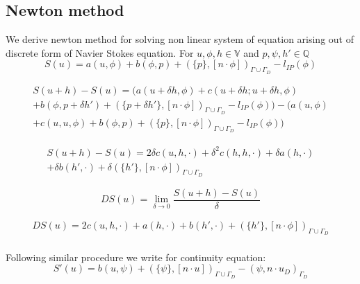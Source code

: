 \documentclass[a4paper,12pt]{book}
\begin{document}
\subsection{Newton method} \cite{Haasdonk} \label{newton_method}

We derive newton method for solving non linear system of equation arising out of discrete form of Navier Stokes equation. For $u, \phi , h \in \mathbb{V}$ and $p, \psi , h' \in \mathbb{Q}$ \\
\begin{equation}
S(u) = a(u,\phi) + b(\phi,p) + (\{p\},[n\cdot \phi])_{\Gamma \cup \Gamma_D} - l_{IP}(\phi)
\end{equation}


\begin{equation}
\begin{split}
S(u+h) - S(u) = (a(u+\delta h,\phi) + c(u + \delta h;u + \delta h,\phi)\\ + b(\phi,p+\delta h') + (\{p+\delta h'\},[n\cdot \phi])_{\Gamma \cup \Gamma_D} - l_{IP}(\phi)) - (a(u,\phi)\\ + c(u,u,\phi) + b(\phi,p) + (\{p\},[n\cdot \phi])_{\Gamma \cup \Gamma_D} - l_{IP}(\phi))
\end{split}
\end{equation}


\begin{equation}
\begin{split}
S(u+h) - S(u) = 2\delta c(u,h,\cdot) + \delta^2 c(h,h,\cdot) + \delta a(h,\cdot)\\ + \delta b(h',\cdot) + \delta (\{h'\},[n\cdot \phi])_{\Gamma \cup \Gamma_D}
\end{split}
\end{equation}


\begin{equation}
DS(u) = \lim_{\delta \to 0} \frac{S(u+h)-S(u)}{\delta}
\end{equation}

\begin{equation}
\begin{split}
DS(u) = 2 c(u,h,\cdot) + a(h,\cdot) + b(h',\cdot) + (\{h'\},[n\cdot \phi])_{\Gamma \cup \Gamma_D}
\end{split}
\end{equation}\\

Following similar procedure we write for continuity equation:\\
\begin{equation}
S'(u) = b(u,\psi) + (\{\psi\},[n \cdot u])_{\Gamma \cup \Gamma_D} - (\psi,n \cdot u_D)_{\Gamma_D}
\end{equation}
\end{document}
